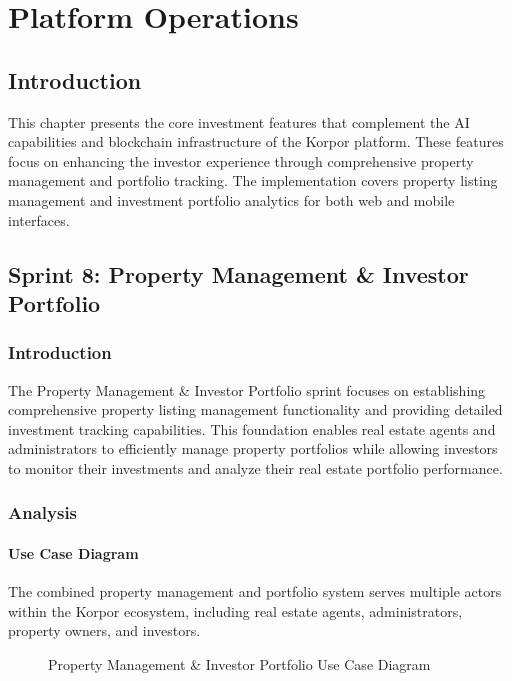 \chapter{Platform Operations}


\section*{Introduction}

This chapter presents the core investment features that complement the AI capabilities and blockchain infrastructure of the Korpor platform. These features focus on enhancing the investor experience through comprehensive property management and portfolio tracking. The implementation covers property listing management and investment portfolio analytics for both web and mobile interfaces.

\section{Sprint 8: Property Management \& Investor Portfolio}

\subsection*{Introduction}
The Property Management \& Investor Portfolio sprint focuses on establishing comprehensive property listing management functionality and providing detailed investment tracking capabilities. This foundation enables real estate agents and administrators to efficiently manage property portfolios while allowing investors to monitor their investments and analyze their real estate portfolio performance.

\subsection{Analysis}
\subsubsection{Use Case Diagram}
The combined property management and portfolio system serves multiple actors within the Korpor ecosystem, including real estate agents, administrators, property owners, and investors.

\begin{figure}[htbp]
    \centering
    \caption{Property Management \& Investor Portfolio Use Case Diagram}
    \label{fig:property-portfolio-use-case}
\end{figure}

